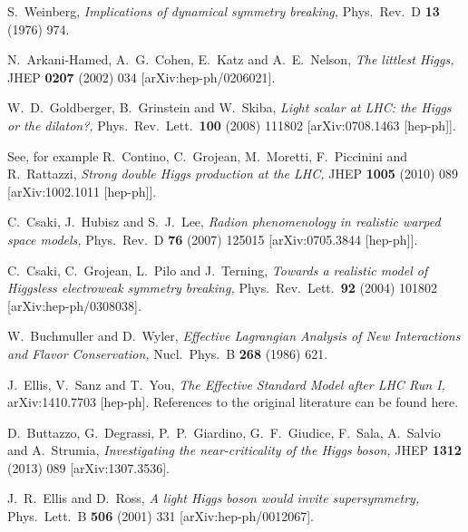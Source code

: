 \documentclass[12pt]{article}
\numberwithin{equation}{section}
\begin{document}
\begin{thebibliography}{99}
S.~Weinberg,
{\it Implications of dynamical symmetry breaking,}
  Phys.\ Rev.\  D {\bf 13} (1976) 974.

N.~Arkani-Hamed, A.~G.~Cohen, E.~Katz and A.~E.~Nelson,
{\it The littlest Higgs,}
  JHEP {\bf 0207} (2002) 034
  [arXiv:hep-ph/0206021].
  
W.~D.~Goldberger, B.~Grinstein and W.~Skiba,
{\it Light scalar at LHC: the Higgs or the dilaton?,}
  Phys.\ Rev.\ Lett.\  {\bf 100} (2008) 111802
  [arXiv:0708.1463 [hep-ph]].
  
See, for example R.~Contino, C.~Grojean, M.~Moretti, F.~Piccinini and R.~Rattazzi,
{\it Strong double Higgs production at the LHC,}
  JHEP {\bf 1005} (2010) 089
  [arXiv:1002.1011 [hep-ph]].

C.~Csaki, J.~Hubisz and S.~J.~Lee,
{\it Radion phenomenology in realistic warped space models,}
  Phys.\ Rev.\  D {\bf 76} (2007) 125015
  [arXiv:0705.3844 [hep-ph]].

C.~Csaki, C.~Grojean, L.~Pilo and J.~Terning,
{\it Towards a realistic model of Higgsless electroweak symmetry breaking,}
  Phys.\ Rev.\ Lett.\  {\bf 92} (2004) 101802
  [arXiv:hep-ph/0308038].

 W.~Buchmuller and D.~Wyler,
{\it Effective Lagrangian Analysis of New Interactions and Flavor Conservation,}
  Nucl.\ Phys.\ B {\bf 268} (1986) 621.

J.~Ellis, V.~Sanz and T.~You,
{\it The Effective Standard Model after LHC Run I,}
  arXiv:1410.7703 [hep-ph]. References to the original literature can be found here.

D.~Buttazzo, G.~Degrassi, P.~P.~Giardino, G.~F.~Giudice, F.~Sala, A.~Salvio and A.~Strumia,
{\it Investigating the near-criticality of the Higgs boson,}
  JHEP {\bf 1312} (2013) 089
  [arXiv:1307.3536].

J.~R.~Ellis and D.~Ross,
{\it A light Higgs boson would invite supersymmetry,}
  Phys.\ Lett.\  B {\bf 506} (2001) 331
  [arXiv:hep-ph/0012067].


  

\end{thebibliography}
\end{document}
